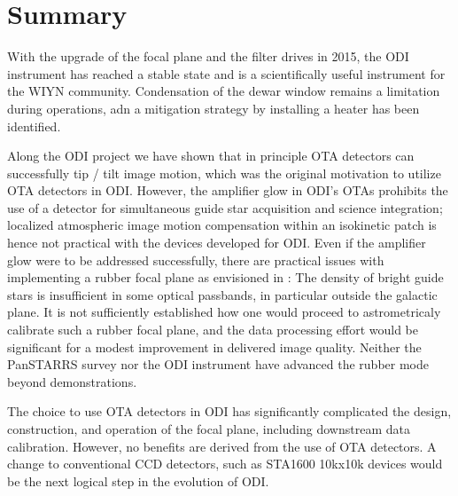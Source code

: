 \documentclass[]{spieman}
\begin{document}
\section{Summary}

With the upgrade of the focal plane and the filter drives in 2015, the ODI
instrument has reached a stable state and is a scientifically useful instrument
for the WIYN community. Condensation of the dewar window remains a limitation
during  operations, adn a mitigation strategy by installing a heater has been
identified.

Along the ODI project we have shown that in principle OTA detectors can
successfully tip / tilt image motion, which was the original motivation to 
utilize OTA detectors in ODI.  However, the amplifier glow in ODI's OTAs
prohibits the use of a detector for simultaneous guide star acquisition and
science integration; localized atmospheric image motion compensation within an
isokinetic patch is hence not practical with the devices developed for ODI. Even
if the amplifier glow were to be addressed successfully, there are practical
issues with implementing a rubber focal plane as envisioned in \cite{tonry2002}:
The density of  bright guide stars is insufficient in some  optical passbands,
in particular outside the galactic plane. It is not sufficiently established how
one would proceed to astrometricaly calibrate such a rubber focal plane, and the
data processing effort would be significant for a modest improvement in
delivered image quality. Neither the PanSTARRS survey nor the ODI
instrument have advanced the rubber mode beyond demonstrations.

The choice to use  OTA detectors in ODI has significantly complicated the
design, construction, and operation of the focal plane, including downstream
data calibration. However, no benefits are derived from the use of OTA
detectors.   A change to conventional CCD detectors, such as STA1600 10kx10k
devices would be the next logical step in the evolution of ODI.

 

\end{document}
